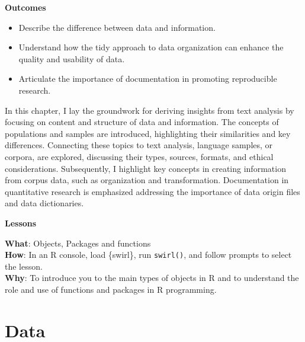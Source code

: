 \documentclass[
  letterpaper,
  krantz1]{latex/krantz-mod}
\providecommand{\tightlist}{%
  \setlength{\itemsep}{0pt}\setlength{\parskip}{0pt}}\usepackage{longtable,booktabs,array}
\theoremstyle{definition}
\theoremstyle{definition}
\theoremstyle{remark}
\begin{document}
\begin{tcolorbox}[enhanced jigsaw, toprule=.15mm, breakable, colback=white, arc=.35mm, left=2mm, colframe=quarto-callout-color-frame, opacityback=0, bottomrule=.15mm, rightrule=.15mm, leftrule=.75mm]

\textbf{ Outcomes}

\begin{itemize}
\tightlist
\item
  Describe the difference between data and information.
\item
  Understand how the tidy approach to data organization can enhance the
  quality and usability of data.
\item
  Articulate the importance of documentation in promoting reproducible
  research.
\end{itemize}

\end{tcolorbox}

In this chapter, I lay the groundwork for deriving insights from text
analysis by focusing on content and structure of data and information.
The concepts of populations and samples are introduced, highlighting
their similarities and key differences. Connecting these topics to text
analysis, language samples, or corpora, are explored, discussing their
types, sources, formats, and ethical considerations. Subsequently, I
highlight key concepts in creating information from corpus data, such as
organization and transformation. Documentation in quantitative research
is emphasized addressing the importance of data origin files and data
dictionaries.

\begin{tcolorbox}[enhanced jigsaw, toprule=.15mm, breakable, colback=white, arc=.35mm, left=2mm, colframe=quarto-callout-color-frame, opacityback=0, bottomrule=.15mm, rightrule=.15mm, leftrule=.75mm]

\textbf{ Lessons}

\textbf{What}: Objects, Packages and functions\\
\textbf{How}: In an R console, load \{swirl\}, run \texttt{swirl()}, and
follow prompts to select the lesson.\\
\textbf{Why}: To introduce you to the main types of objects in R and to
understand the role and use of functions and packages in R programming.

\end{tcolorbox}

\section{Data}\label{sec-data-data}
\end{document}
